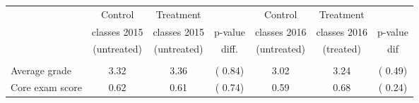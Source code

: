 \begin{tabular}{lcccccc} \toprule \toprule
& Control & Treatment & & Control & Treatment & \\
& classes 2015 & classes 2015& p-value & classes 2016 & classes 2016 & p-value \\
& (untreated) & (untreated) & diff. & (untreated) & (treated) & dif\\
\midrule \\
Average grade&  3.32&  3.36&(  0.84)&  3.02&  3.24&(  0.49) \\
Core exam score&  0.62&  0.61&(  0.74)&  0.59&  0.68&(  0.24) \\
\bottomrule \bottomrule
\end{tabular}
